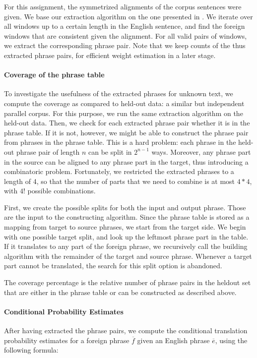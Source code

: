 \documentclass[11pt]{article}
\begin{document}
For this assignment, the symmetrized alignments of the corpus sentences were given. 
We base our extraction algorithm on the one presented in \cite[page 133]{Koehn:2010}.
We iterate over all windows up to a certain length in the English sentence, and find the foreign windows that are consistent given the alignment. For all valid pairs of windows, we extract the corresponding phrase pair. Note that we keep counts of the thus extracted phrase pairs, for efficient weight estimation in a later stage.


\paragraph{Coverage of the phrase table}
To investigate the usefulness of the extracted phrases for unknown text, we compute the coverage as compared to held-out data: a similar but independent parallel corpus. For this purpose, we run the same extraction algorithm on the held-out data. Then, we check for each extracted phrase pair whether it is in the phrase table. If it is not, however, we might be able to construct the phrase pair from phrases in the phrase table. This is a hard problem: each phrase in the held-out phrase pair of length $n$ can be split in $2^{n-1}$ ways. Moreover, any phrase part in the source can be aligned to any phrase part in the target, thus introducing a combinatoric problem. Fortunately, we restricted the extracted phrases to a length of 4, so that the number of parts that we need to combine is at most $4*4$, with $4!$ possible combinations.


 First, we create the possible splits for both the input and output phrase. Those are the input to the constructing algorithm.
Since the phrase table is stored as a mapping from target to source phrases, we start from the target side. 
We begin with one possible target split, and look up the leftmost phrase part in the table. If it translates to any part of the foreign phrase, we recursively call the building algorithm with the remainder of the target and source phrase. Whenever a target part cannot be translated, the search for this split option is abandoned. 

The coverage percentage is the relative number of phrase pairs in the heldout set that are either in the phrase table or can be constructed as described above.


\paragraph{Conditional Probability Estimates}
After having extracted the phrase pairs, we compute the conditional translation probability estimates for a foreign phrase $\overline{f}$ given an English phrase $\overline{e}$, using the following formula:
\end{document}
